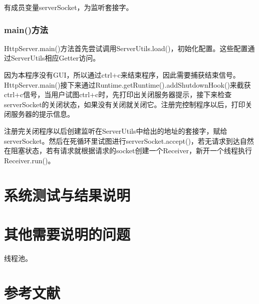 \documentclass[UTF8,12pt]{ctexart}
\begin{document}
有成员变量serverSocket，为监听套接字。

\subsubsection{main()方法}

HttpServer.main()方法首先尝试调用ServerUtils.load()，初始化配置。这些配置通过ServerUtils相应Getter访问。

因为本程序没有GUI，所以通过ctrl+c来结束程序，因此需要捕获结束信号。HttpServer.main()接下来通过Runtime.getRuntime().addShutdownHook()来截获ctrl+c信号，当用户试图ctrl+c时，先打印出关闭服务器提示，接下来检查serverSocket的关闭状态，如果没有关闭就关闭它。注册完控制程序以后，打印关闭服务器的提示信息。

注册完关闭程序以后创建监听在ServerUtils中给出的地址的套接字，赋给serverSocket。然后在死循环里试图进行serverSocket.accept()，若无请求到达自然在阻塞状态，若有请求就根据请求的socket创建一个Receiver，新开一个线程执行Receiver.run()。

\section{系统测试与结果说明}

\section{其他需要说明的问题}

线程池。

\section{参考文献}
	
\end{document}
